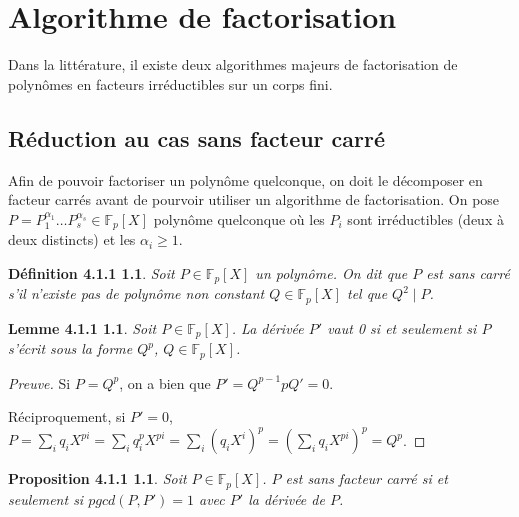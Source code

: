 ﻿\chapter{Algorithme de factorisation}
\label{Algorithme de factorisation}

	Dans la littérature, il existe deux algorithmes majeurs de factorisation de polynômes en facteurs irréductibles sur un corps fini.

\section{Réduction au cas sans facteur carré}
\label{Réduction au cas sans facteur carré}

	Afin de pouvoir factoriser un polynôme quelconque, on doit le décomposer en facteur carrés avant de pourvoir utiliser un algorithme de factorisation.
	On pose $P=P_{1}^{\alpha_{1}}\ldots P_{s}^{\alpha_{s}}\in\mathbb{F}_{p}[X]$ polynôme quelconque où les $P_{i}$ sont irréductibles (deux à deux distincts) et les $\alpha_{i}\geq1$.

\newtheorem*{def2}{Définition 4.1.1}
\begin{def2}
	Soit $P\in\mathbb{F}_{p}[X]$ un polynôme.
	On dit que $P$ est sans carré s’il n’existe pas de polynôme non constant $Q\in\mathbb{F}_{p}[X]$ tel que $Q^{2}\mid P$.
\end{def2}

\newtheorem*{lem1}{Lemme 4.1.1}
\begin{lem1}
	Soit $P\in\mathbb{F}_{p}[X]$.
	La dérivée $P'$ vaut 0 si et seulement si $P$ s'écrit sous la forme $Q^{p}$, $Q\in\mathbb{F}_{p}[X]$.
\end{lem1}

\begin{proof}[Preuve]
	Si $P=Q^{p}$, on a bien que $P'=Q^{p-1}pQ'=0$.

	Réciproquement, si $P'=0$, $P=\sum_{i}{q_{i}X^{pi}}=\sum_{i}{q_{i}^{p}X^{pi}}=\sum_{i}{(q_{i}X^{i})^{p}}=\left(\sum_{i}{q_{i}X^{pi}}\right)^{p}=Q^{p}$.
\end{proof}

\newtheorem*{prop7}{Proposition 4.1.1}
\begin{prop7}
	Soit $P\in\mathbb{F}_{p}[X]$.
	$P$ est sans facteur carré si et seulement si $pgcd(P,P')=1$ avec $P'$ la dérivée de $P$.
\end{prop7}

